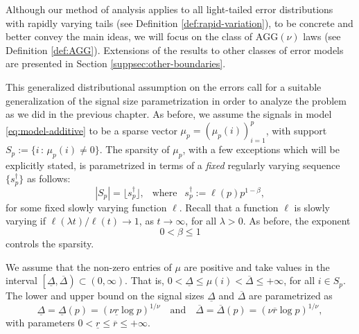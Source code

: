 Although our method of analysis applies to all light-tailed error distributions with rapidly varying tails (see Definition \ref{def:rapid-variation}), to be concrete and better convey the main ideas, we will focus on the class of $\mathrm{AGG}(\nu)$ laws (see Definition \ref{def:AGG}).
Extensions of the results to other classes of error models are presented in Section \ref{suppsec:other-boundaries}.

This generalized distributional assumption on the errors call for a suitable generalization of the signal size parametrization in order to analyze the problem as we did in the previous chapter.
As before, we assume the signals in model \eqref{eq:model-additive} to be a sparse vector $\mu_p = \left(\mu_p(i)\right)_{i=1}^p$, with support $S_p:= \{i\, :\, \mu_p(i)\not = 0\}$.
The sparsity of $\mu_p$,  with a few exceptions which will be explicitly stated, is parametrized in terms of a {\em fixed} regularly varying sequence $\{s_p^\dagger\}$ as follows:
\begin{equation} \label{eq:sparsity-parametrized}
 |S_p| =   \lfloor s_p^\dagger \rfloor,\ \ \mbox{ where }\ \ s_p^\dagger := \ell(p) p^{1-\beta},
\end{equation}
for some fixed slowly varying function $\ell$.  
Recall that a function $\ell$ is slowly varying if $\ell(\lambda t)/\ell(t) \to 1$, as $t\to\infty$, for all $\lambda>0$. 
As before, the exponent $$0 <\beta \le 1$$ controls the sparsity.

We assume that the non-zero entries of $\mu$ are positive and take values in the interval $\left[\underline{\Delta},\overline{\Delta}\right)\subset (0,\infty)$.
That is, $0<\underline{\Delta}\le\mu(i)<\overline{\Delta}\le+\infty$, for all $i\in S_p$.
The lower and upper bound on the signal sizes $\underline{\Delta}$ and $\overline{\Delta}$ are parametrized as
\begin{equation} \label{eq:signal-size-parametrized}
    \underline{\Delta} = \underline{\Delta}(p) = (\nu \underline{r} \log{p})^{1/\nu} \quad \text{and} \quad
    \overline{\Delta} = \overline{\Delta}(p)  = (\nu \overline{r} \log{p})^{1/\nu},
\end{equation}
with parameters $0 < \underline{r} \le \overline{r} \le +\infty$.


